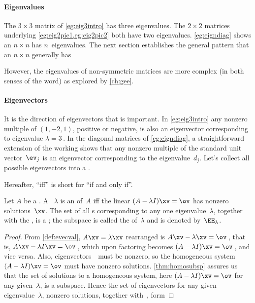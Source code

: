 \paragraph{Eigenvalues}
The \(3\times 3\) matrix of \cref{eg:eig3intro} has three eigenvalues.
The \(2\times2\) matrices underlying \cref{eg:eig2pic1,eg:eig2pic2} both have two eigenvalues.
\cref{eg:eigndiag} shows an \(n\times n\)  has \(n\)~eigenvalues.
The next section establishes the general pattern that an \(n\times n\) \emph{} generally has 

However, the eigenvalues of non-symmetric matrices are more complex (in both senses of the word) as explored by \cref{ch:gee}.

\paragraph{Eigenvectors}
It is the direction of eigenvectors that is important.
In \cref{eg:eig3intro} any nonzero multiple of \((1,-2,1)\), positive or negative, is also an eigenvector corresponding to eigenvalue \(\lambda=3\)\,.
In the diagonal matrices of \cref{eg:eigndiag}, a straightforward extension of the working shows that any nonzero multiple of the standard unit vector~\(\ev_j\) is an eigenvector corresponding to the eigenvalue~\(d_j\).
Let's collect all possible eigenvectors into a . 

Hereafter, ``iff'' is short for ``if and only if''.


\begin{theorem} \label{thm:espacedef} 
Let \(A\) be a . 
A ~\(\lambda\) is an  of~\(A\) iff the  linear  \((A-\lambda I)\xv=\ov\) has nonzero solutions~\(\xv\).  
The set of all s corresponding to any one eigenvalue~\(\lambda\), together with the , is a ; the subspace is called the  of~\(\lambda\) and is denoted by~\(\EE_\lambda\).
\end{theorem}



\begin{proof} 
From \cref{def:evecval},  \(A\xv=\lambda\xv\)  rearranged is \(A\xv-\lambda\xv=\ov\)\,, that is, \(A\xv-\lambda I\xv=\ov\)\,, which upon factoring becomes \((A-\lambda I)\xv=\ov\)\,, and vice versa.  
Also, eigenvectors~\xv\ must be nonzero, so the homogeneous system \((A-\lambda I)\xv=\ov\) must have nonzero solutions.
\cref{thm:homosubsp} assures us that the set of solutions to a homogeneous system, here \((A-\lambda I)\xv=\ov\) for any given~\(\lambda\), is a subspace. 
Hence the set of eigenvectors for any given eigenvalue~\(\lambda\), nonzero solutions, together with~\ov, form 
\end{proof}


